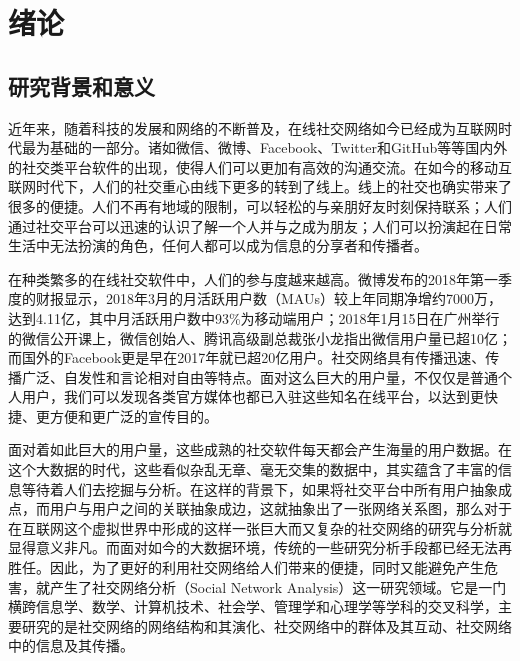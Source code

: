 \chapter{绪论}
\section{研究背景和意义}
近年来，随着科技的发展和网络的不断普及，在线社交网络如今已经成为互联网时代最为基础的一部分。诸如微信、微博、Facebook、Twitter和GitHub等等国内外的社交类平台软件的出现，使得人们可以更加有高效的沟通交流。在如今的移动互联网时代下，人们的社交重心由线下更多的转到了线上。线上的社交也确实带来了很多的便捷。人们不再有地域的限制，可以轻松的与亲朋好友时刻保持联系；人们通过社交平台可以迅速的认识了解一个人并与之成为朋友；人们可以扮演起在日常生活中无法扮演的角色，任何人都可以成为信息的分享者和传播者。

在种类繁多的在线社交软件中，人们的参与度越来越高。微博发布的2018年第一季度的财报显示，2018年3月的月活跃用户数（MAUs）较上年同期净增约7000万，达到4.11亿，其中月活跃用户数中93\%为移动端用户；2018年1月15日在广州举行的微信公开课上，微信创始人、腾讯高级副总裁张小龙指出微信用户量已超10亿；而国外的Facebook更是早在2017年就已超20亿用户。社交网络具有传播迅速、传播广泛、自发性和言论相对自由等特点。面对这么巨大的用户量，不仅仅是普通个人用户，我们可以发现各类官方媒体也都已入驻这些知名在线平台，以达到更快捷、更方便和更广泛的宣传目的。

面对着如此巨大的用户量，这些成熟的社交软件每天都会产生海量的用户数据。在这个大数据的时代，这些看似杂乱无章、毫无交集的数据中，其实蕴含了丰富的信息等待着人们去挖掘与分析。在这样的背景下，如果将社交平台中所有用户抽象成点，而用户与用户之间的关联抽象成边，这就抽象出了一张网络关系图，那么对于在互联网这个虚拟世界中形成的这样一张巨大而又复杂的社交网络的研究与分析就显得意义非凡。而面对如今的大数据环境，传统的一些研究分析手段都已经无法再胜任。因此，为了更好的利用社交网络给人们带来的便捷，同时又能避免产生危害，就产生了社交网络分析（Social Network Analysis）这一研究领域。它是一门横跨信息学、数学、计算机技术、社会学、管理学和心理学等学科的交叉科学，主要研究的是社交网络的网络结构和其演化、社交网络中的群体及其互动、社交网络中的信息及其传播。

